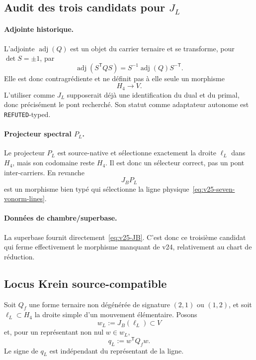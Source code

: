 \documentclass[11pt,a4paper]{article}
\newcommand{\certRefuted}{\texttt{REFUTED}}
\begin{document}
\subsection{Audit des trois candidats pour \texorpdfstring{$J_L$}{JL}}

\paragraph{Adjointe historique.}
L'adjointe $\operatorname{adj}(Q)$ est un objet du carrier ternaire et se transforme, pour $\det S=\pm1$, par
\[
 \operatorname{adj}(S^{\mathsf T}QS)
 =
 S^{-1}\operatorname{adj}(Q)S^{-\mathsf T}.
\]
Elle est donc contragrédiente et ne définit pas à elle seule un morphisme
\[
 H_4\to V.
\]
L'utiliser comme $J_L$ supposerait déjà une identification du dual et du primal, donc précisément le pont recherché. Son statut comme adaptateur autonome est \certRefuted{}-typed.

\paragraph{Projecteur spectral $P_L$.}
Le projecteur $P_L$ est source-native et sélectionne exactement la droite $\ell_L$ dans $H_4$, mais son codomaine reste $H_4$. Il est donc un sélecteur correct, pas un pont inter-carriers. En revanche
\[
 \boxed{J_BP_L}
\]
est un morphisme bien typé qui sélectionne la ligne physique~\eqref{eq:v25-seven-vonorm-lines}.

\paragraph{Données de chambre/superbase.}
La superbase fournit directement~\eqref{eq:v25-JB}. C'est donc ce troisième candidat qui ferme effectivement le morphisme manquant de v24, relativement au chart de réduction.

\subsection{Locus Krein source-compatible}

Soit $Q_f$ une forme ternaire non dégénérée de signature $(2,1)$ ou $(1,2)$, et soit $\ell_L\subset H_4$ la droite simple d'un mouvement élémentaire. Posons
\[
 w_L:=J_B(\ell_L)\subset V
\]
et, pour un représentant non nul $w\in w_L$,
\begin{equation}\label{eq:v25-qL}
 \boxed{q_L:=w^{\mathsf T}Q_fw.}
\end{equation}
Le signe de $q_L$ est indépendant du représentant de la ligne.
\end{document}
